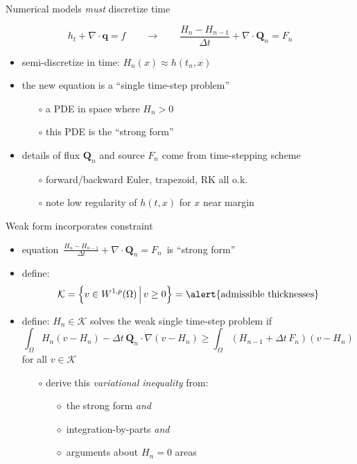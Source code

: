 \documentclass{beamer}
\newcommand\bq{\mathbf{q}}
\newcommand\bQ{\mathbf{Q}}
\newcommand{\Div}{\nabla\cdot}
\newcommand{\grad}{\nabla}
\begin{document}
\begin{frame}{Numerical models \emph{must} discretize time}

$$h_t + \Div\bq = f \qquad \to \qquad \frac{H_n - H_{n-1}}{\Delta t} + \Div \bQ_n = F_n$$

  \begin{itemize}
  \item semi-discretize in time: $H_n(x) \approx h(t_n,x)$
  \item the new equation is a ``single time-step problem''
    \begin{itemize}
    \item[$\circ$] a PDE in space \alert{where $H_n>0$}
    \item[$\circ$] this PDE is the ``strong form''
    \end{itemize}
  \item details of flux $\bQ_n$ and source $F_n$ come from time-stepping scheme
    \begin{itemize}
    \item[$\circ$] forward/backward Euler, trapezoid, RK all o.k.
    \item[$\circ$] note low regularity of $h(t,x)$ for $x$ near margin
    \end{itemize}
  \end{itemize}
\end{frame}


\begin{frame}{Weak form incorporates constraint}

  \begin{itemize}
  \item equation \,$\frac{H_n - H_{n-1}}{\Delta t} + \Div \bQ_n = F_n$\, is ``strong form''
  \item define:
    $$\mathcal{K} = \left\{v \in W^{1,p}(\Omega) \,\Big|\, v\ge 0\right\} = \text{\alert{admissible thicknesses}}$$
  \item define: $H_n \in \mathcal{K}$ solves the \alert{weak single time-step problem} if
    $$\int_\Omega H_n (v - H_n) - \Delta t\, \bQ_n \cdot \grad(v - H_n) \ge \int_\Omega \left(H_{n-1} + \Delta t\, F_n\right) (v - H_n)$$
  for all $v \in \mathcal{K}$
  \small
  \medskip
    \begin{itemize}
    \item[$\circ$] derive this \emph{variational inequality} from:
      \begin{itemize}
      \item[$\diamond$] the strong form \emph{and}
      \item[$\diamond$] integration-by-parts \emph{and}
      \item[$\diamond$] arguments about $H_n=0$ areas
      \end{itemize}
    \end{itemize}
  \end{itemize}
\end{frame}
\end{document}
